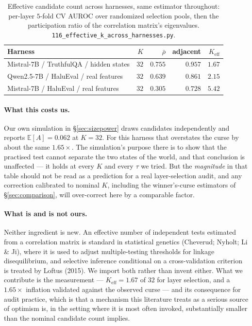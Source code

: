 \documentclass{article}
\begin{document}
\begin{table}[h]
\centering
\small
\begin{tabular}{@{}lrrrr@{}}
\toprule
Harness & $K$ & $\bar\rho$ & adjacent & $K_{\text{eff}}$ \\
\midrule
Mistral-7B / TruthfulQA / hidden states & $32$ & $0.755$ & $0.957$ & $1.67$ \\
Qwen2.5-7B / HaluEval / real features & $32$ & $0.639$ & $0.861$ & $2.15$ \\
Mistral-7B / HaluEval / real features & $32$ & $0.305$ & $0.728$ & $5.42$ \\
\bottomrule
\end{tabular}
\caption{Effective candidate count across harnesses, same estimator
throughout: per-layer $5$-fold CV AUROC over randomized selection pools, then
the participation ratio of the correlation matrix's eigenvalues.
\texttt{116\_effective\_k\_across\_harnesses.py}.}
\label{tab:keff}
\end{table}

\paragraph{What this costs us.} Our own simulation in
\S\ref{sec:sizepower} draws candidates independently and reports
$\mathbb{E}[A]=0.062$ at $K=32$. For this harness that overstates the curse by
about the same $1.65\times$. The simulation's purpose there is to show that
the practised test cannot separate the two states of the world, and that
conclusion is unaffected --- it holds at every $K$ and every $\tau$ we tried.
But the \emph{magnitude} in that table should not be read as a prediction for
a real layer-selection audit, and any correction calibrated to nominal $K$,
including the winner's-curse estimators of \S\ref{sec:comparison}, will
over-correct here by a comparable factor.

\paragraph{What is and is not ours.} Neither ingredient is new. An effective
number of independent tests estimated from a correlation matrix is standard in
statistical genetics (Cheverud; Nyholt; Li \& Ji), where it is used to adjust
multiple-testing thresholds for linkage disequilibrium, and selective
inference conditional on a cross-validation criterion is treated by Loftus
(2015). We import both rather than invent either. What we contribute is the
measurement --- $K_{\text{eff}}=1.67$ of $32$ for layer selection, and a
$1.65\times$ inflation validated against the observed curse --- and its
consequence for audit practice, which is that a mechanism this literature
treats as a serious source of optimism is, in the setting where it is most
often invoked, substantially smaller than the nominal candidate count
implies.
\end{document}
